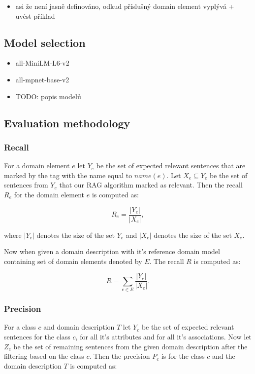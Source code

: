 \begin{itemize}
\item asi že není jasně definováno, odkud příslušný domain element vyplývá + uvést příklad
\end{itemize}


\subsection{Model selection}

\begin{itemize}
\item all-MiniLM-L6-v2
\item all-mpnet-base-v2
\item TODO: popis modelů
\end{itemize}


\subsection{Evaluation methodology}


\subsubsection{Recall}

For a domain element $e$ let $Y_e$ be the set of expected relevant sentences that are marked by the tag with the name equal to $name(e)$. Let $X_e \subseteq Y_e$ be the set of sentences from $Y_e$ that our RAG algorithm marked as relevant. Then the recall $R_e$ for the domain element $e$ is computed as:

\[ R_e = \dfrac{|Y_e|}{|X_e|}, \]

\noindent{}where $|Y_e|$ denotes the size of the set $Y_e$ and $|X_e|$ denotes the size of the set $X_e$.

Now when given a domain description with it's reference domain model containing set of domain elements denoted by $E$. The recall $R$ is computed as:

\[ R = \sum_{e \in E} \dfrac{|Y_e|}{|X_e|}. \]


\subsubsection{Precision}

For a class $c$ and domain description $T$ let $Y_c$ be the set of expected relevant sentences for the class $c$, for all it's attributes and for all it's associations. Now let $Z_c$ be the set of remaining sentences from the given domain description after the filtering based on the class $c$. Then the precision $P_c$ is for the class $c$ and the domain description $T$ is computed as:

